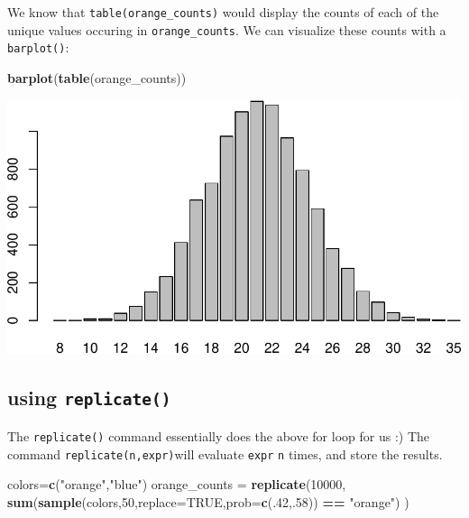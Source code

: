 \documentclass[
]{book}
\newenvironment{Shaded}{\begin{snugshade}}{\end{snugshade}}
\newcommand{\AttributeTok}[1]{\textcolor[rgb]{0.13,0.29,0.53}{#1}}
\newcommand{\ConstantTok}[1]{\textcolor[rgb]{0.56,0.35,0.01}{#1}}
\newcommand{\DecValTok}[1]{\textcolor[rgb]{0.00,0.00,0.81}{#1}}
\newcommand{\FunctionTok}[1]{\textcolor[rgb]{0.13,0.29,0.53}{\textbf{#1}}}
\newcommand{\NormalTok}[1]{#1}
\newcommand{\OtherTok}[1]{\textcolor[rgb]{0.56,0.35,0.01}{#1}}
\newcommand{\SpecialCharTok}[1]{\textcolor[rgb]{0.81,0.36,0.00}{\textbf{#1}}}
\newcommand{\StringTok}[1]{\textcolor[rgb]{0.31,0.60,0.02}{#1}}
\theoremstyle{definition}
\theoremstyle{definition}
\theoremstyle{definition}
\theoremstyle{definition}
\theoremstyle{remark}
\begin{document}
We know that \texttt{table(orange\_counts)} would display the counts of each of the unique values occuring in \texttt{orange\_counts}. We can visualize these counts with a \texttt{barplot()}:

\begin{Shaded}
\begin{Highlighting}[]
\FunctionTok{barplot}\NormalTok{(}\FunctionTok{table}\NormalTok{(orange\_counts))}
\end{Highlighting}
\end{Shaded}

\includegraphics{math340-notes_files/figure-latex/unnamed-chunk-96-1.pdf}

\subsection*{\texorpdfstring{using \texttt{replicate()}}{using replicate()}}\label{using-replicate}

The \texttt{replicate()} command essentially does the above for loop for us :) The command \texttt{replicate(n,expr)}will evaluate \texttt{expr} \texttt{n} times, and store the results.

\begin{Shaded}
\begin{Highlighting}[]
\NormalTok{colors}\OtherTok{=}\FunctionTok{c}\NormalTok{(}\StringTok{"orange"}\NormalTok{,}\StringTok{"blue"}\NormalTok{)}
\NormalTok{orange\_counts }\OtherTok{=} 
  \FunctionTok{replicate}\NormalTok{(}\DecValTok{10000}\NormalTok{,}
            \FunctionTok{sum}\NormalTok{(}\FunctionTok{sample}\NormalTok{(colors,}\DecValTok{50}\NormalTok{,}\AttributeTok{replace=}\ConstantTok{TRUE}\NormalTok{,}\AttributeTok{prob=}\FunctionTok{c}\NormalTok{(.}\DecValTok{42}\NormalTok{,.}\DecValTok{58}\NormalTok{)) }\SpecialCharTok{==} \StringTok{"orange"}\NormalTok{)}
\NormalTok{            )}
\end{Highlighting}
\end{Shaded}
\end{document}

